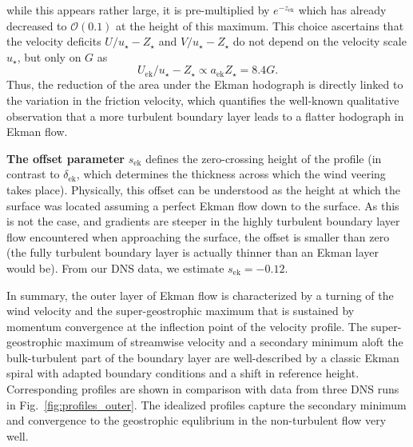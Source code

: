 \documentclass[a4paper,11pt]{amsart}
\begin{document}
while this appears rather large, it is pre-multiplied by $e^{-z_\mathrm{ek}}$ which has already decreased
to $\mathcal{O}(0.1)$ at the height of this maximum.
%
This choice ascertains that the velocity deficits $U/u_\star-Z_\star$ and $V/u_\star-Z_\star$ do not
depend on the velocity scale $u_\star$, but only on $G$ as
\begin{equation}
  U_\mathrm{ek}/u_\star-Z_\star \propto a_\mathrm{ek} Z_\star = 8.4G.
  \label{eqn:hodograph_scaling}
\end{equation}
Thus, the reduction of the area under the Ekman hodograph is directly linked to the variation
in the friction velocity, which quantifies the well-known qualitative observation that a more turbulent boundary
layer leads to a flatter hodograph in Ekman flow.
%
\par
%
\textbf{The offset parameter} $s_\mathrm{ek}$ defines the zero-crossing height of the profile
(in contrast to $\delta_\mathrm{ek}$, which determines the thickness across which the wind veering takes place). 
%
Physically, this offset can be understood as the height at which the surface was located assuming
a perfect Ekman flow down to the surface.
%
As this is not the case, and gradients are steeper in the highly turbulent boundary layer flow encountered
when approaching the surface, the offset is smaller than zero (the fully turbulent boundary layer is
actually thinner than an Ekman layer would be).
%
From our DNS data, we estimate $s_\mathrm{ek}=-0.12$. 
%
\par 
% 
In summary, the outer layer of Ekman flow is characterized by a turning of the wind
velocity and the super-geostrophic maximum that is sustained by momentum convergence
at the inflection point of the velocity profile.
%
The super-geostrophic maximum of streamwise velocity and a secondary minimum aloft the bulk-turbulent part of
the boundary layer are well-described by a classic Ekman spiral with adapted boundary conditions and a shift
in reference height.
%
Corresponding profiles are shown in comparison with data from three DNS runs in Fig.~\ref{fig:profiles_outer}.
The idealized profiles capture the secondary minimum and convergence to the geostrophic equlibrium in the
non-turbulent flow very well.
%
\end{document}
